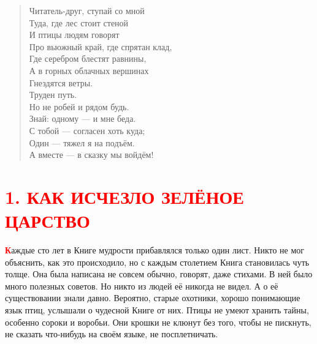 \documentclass[oneside,final,14pt]{extreport}
\begin{document}
	\thispagestyle{empty} %
	
	\newpage
	
	\begin{flushleft}
		\begin{verse}
			\qquad \qquad Читатель-друг, ступай со мной\\
			\qquad \qquad Туда, где лес стоит стеной\\
			\qquad \qquad И птицы людям говорят\\
			\qquad \qquad Про вьюжный край, где спрятан клад,\\
			\qquad \qquad Где серебром блестят равнины,\\
			\qquad \qquad А в горных облачных вершинах\\
			\qquad \qquad Гнездятся ветры.\\
			\qquad \qquad\qquad\qquad\qquad\qquad Труден путь.\\
			\qquad \qquad Но не робей и рядом будь.\\
			\qquad \qquad Знай: одному — и мне беда.\\
			\qquad \qquad С тобой — согласен хоть куда;\\
			\qquad \qquad Один — тяжел я на подъём.\\
			\qquad \qquad А вместе — в сказку мы войдём!\\
			\qquad \qquad 
		\end{verse}
	\end{flushleft}

\setcounter{secnumdepth}{0}  
	
	\section[1. Как исчезло зелёное царство]{\center \textcolor{red}{1. КАК ИСЧЕЗЛО ЗЕЛЁНОЕ ЦАРСТВО}}
	
	\lettrine[findent=0pt]{\textbf{\textcolor{red}{К}}}{}аждые сто лет в Книге мудрости прибавлялся только один лист. Никто не мог объяснить, как это происходило, но с каждым столетием Книга становилась чуть толще. Она была написана не совсем обычно, говорят, даже стихами. В ней было много полезных советов. Но никто из людей её никогда не видел. А о её существовании знали давно. Вероятно, старые охотники, хорошо понимающие язык птиц, услышали о чудесной Книге от них. Птицы не умеют хранить тайны, особенно сороки и воробьи. Они крошки не клюнут без того, чтобы не пискнуть, не сказать что-нибудь на своём языке, не посплетничать.
	
\end{document}
